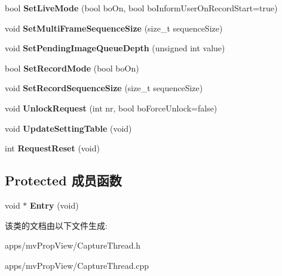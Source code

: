 \begin{DoxyCompactItemize}
\item 
\hypertarget{class_capture_thread_a7bf48c382e7851d568b44c0e7884b488}{bool {\bfseries Set\+Live\+Mode} (bool bo\+On, bool bo\+Inform\+User\+On\+Record\+Start=true)}\label{class_capture_thread_a7bf48c382e7851d568b44c0e7884b488}

\item 
\hypertarget{class_capture_thread_a861574b9268eb73c3697d6a7e0f2b65b}{void {\bfseries Set\+Multi\+Frame\+Sequence\+Size} (size\+\_\+t sequence\+Size)}\label{class_capture_thread_a861574b9268eb73c3697d6a7e0f2b65b}

\item 
\hypertarget{class_capture_thread_a6f662e20d2cc72fc5b01c64f000ede4c}{void {\bfseries Set\+Pending\+Image\+Queue\+Depth} (unsigned int value)}\label{class_capture_thread_a6f662e20d2cc72fc5b01c64f000ede4c}

\item 
\hypertarget{class_capture_thread_afd51d5a09d8ec4053dada37fc049512e}{bool {\bfseries Set\+Record\+Mode} (bool bo\+On)}\label{class_capture_thread_afd51d5a09d8ec4053dada37fc049512e}

\item 
\hypertarget{class_capture_thread_a2b0f6ebc9c7150a742dda6678ae3fbd7}{void {\bfseries Set\+Record\+Sequence\+Size} (size\+\_\+t sequence\+Size)}\label{class_capture_thread_a2b0f6ebc9c7150a742dda6678ae3fbd7}

\item 
\hypertarget{class_capture_thread_aa6eddace76e950ecdbef9132848b70a9}{void {\bfseries Unlock\+Request} (int nr, bool bo\+Force\+Unlock=false)}\label{class_capture_thread_aa6eddace76e950ecdbef9132848b70a9}

\item 
\hypertarget{class_capture_thread_a5e9511d7d715e971a35e327a955c424d}{void {\bfseries Update\+Setting\+Table} (void)}\label{class_capture_thread_a5e9511d7d715e971a35e327a955c424d}

\item 
\hypertarget{class_capture_thread_a9474b16f7c92216025a77842dcc5a4dc}{int {\bfseries Request\+Reset} (void)}\label{class_capture_thread_a9474b16f7c92216025a77842dcc5a4dc}

\end{DoxyCompactItemize}
\subsection*{Protected 成员函数}
\begin{DoxyCompactItemize}
\item 
\hypertarget{class_capture_thread_a4dbbe4fe65412b8d04edbf47ffcdf968}{void $\ast$ {\bfseries Entry} (void)}\label{class_capture_thread_a4dbbe4fe65412b8d04edbf47ffcdf968}

\end{DoxyCompactItemize}


该类的文档由以下文件生成\+:\begin{DoxyCompactItemize}
\item 
apps/mv\+Prop\+View/Capture\+Thread.\+h\item 
apps/mv\+Prop\+View/Capture\+Thread.\+cpp\end{DoxyCompactItemize}

